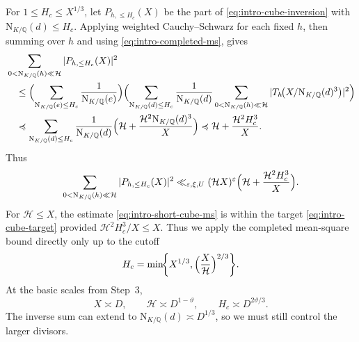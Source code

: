 \documentclass[11pt,a4paper]{article}
\numberwithin{equation}{section}
\numberwithin{figure}{section}
\theoremstyle{definition}
\theoremstyle{remark}
\newcommand{\Q}{\mathbb Q}
\newcommand{\NK}{\mathrm N_{K/\Q}}
\newcommand{\precbd}{\preccurlyeq}
\begin{document}
For $1\le H_c\le X^{1/3}$, let $P_{h,\le H_c}(X)$ be the part of
\eqref{eq:intro-cube-inversion} with $\NK(d)\le H_c$.
Applying weighted Cauchy--Schwarz for each fixed $h$, then summing over $h$
and using \eqref{eq:intro-completed-ms}, gives
\[
 \begin{aligned}
 &\sum_{0<\NK(h)\ll\mathcal H}|P_{h,\le H_c}(X)|^2\\
 &\quad\le\Bigl(\sum_{\NK(e)\le H_c}\frac1{\NK(e)}\Bigr)
       \Bigl(\sum_{\NK(d)\le H_c}\frac1{\NK(d)}
       \sum_{0<\NK(h)\ll\mathcal H}
       |T_h\!\bigl(X/\NK(d)^3\bigr)|^2\Bigr)\\
 &\quad\precbd\sum_{\NK(d)\le H_c}\frac1{\NK(d)}
       \Bigl(\mathcal H+\frac{\mathcal H^2\NK(d)^3}{X}\Bigr)
       \precbd\mathcal H+\frac{\mathcal H^2H_c^3}{X}.
 \end{aligned}
\]
Thus
\begin{equation}\label{eq:intro-short-cube-ms}
 \sum_{0<\NK(h)\ll\mathcal H}|P_{h,\le H_c}(X)|^2
 \ll_{\varepsilon,\xi,U}(\mathcal H X)^\varepsilon
       \Bigl(\mathcal H+\frac{\mathcal H^2H_c^3}{X}\Bigr).
\end{equation}
For $\mathcal H\le X$, the estimate \eqref{eq:intro-short-cube-ms} is within the target \eqref{eq:intro-cube-target} provided $\mathcal H^2H_c^3/X\le X$. Thus we apply the completed mean-square bound directly only up to the cutoff
\begin{equation}\label{eq:intro-cube-cutoff}
 H_c=\min\!\biggl\{X^{1/3},
                \Bigl(\frac{X}{\mathcal H}\Bigr)^{2/3}\biggr\}.
\end{equation}
At the basic scales from Step~3,
\[
 X\asymp D,\qquad \mathcal H\asymp D^{1-\vartheta},
 \qquad H_c\asymp D^{2\vartheta/3}.
\]
The inverse sum can extend to $\NK(d)\asymp D^{1/3}$, so we must
still control the larger divisors.
\end{document}
